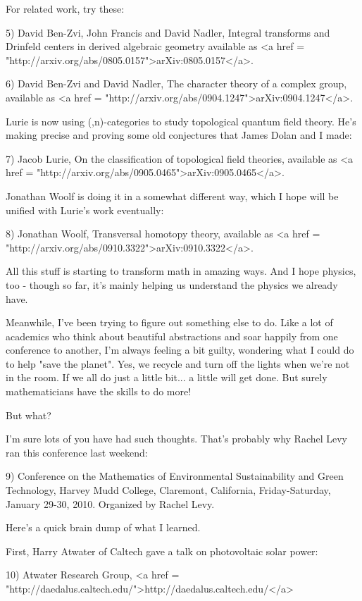 For related work, try these:

5) David Ben-Zvi, John Francis and David Nadler, Integral transforms
and Drinfeld centers in derived algebraic geometry available as
<a href = "http://arxiv.org/abs/0805.0157">arXiv:0805.0157</a>.

6) David Ben-Zvi and David Nadler, The character theory of a complex
group, available as 
<a href = "http://arxiv.org/abs/0904.1247">arXiv:0904.1247</a>.

Lurie is now using (\infty ,n)-categories to study topological
quantum field theory.  He's making precise and proving some old
conjectures that James Dolan and I made:

7) Jacob Lurie, On the classification of topological field theories,
available as 
<a href = "http://arxiv.org/abs/0905.0465">arXiv:0905.0465</a>.

Jonathan Woolf is doing it in a somewhat different way, which I hope
will be unified with Lurie's work eventually:

8) Jonathan Woolf, Transversal homotopy theory, available as
<a href = "http://arxiv.org/abs/0910.3322">arXiv:0910.3322</a>.

All this stuff is starting to transform math in amazing ways.  And I
hope physics, too - though so far, it's mainly helping us understand
the physics we already have.

Meanwhile, I've been trying to figure out something else to do.  Like
a lot of academics who think about beautiful abstractions and soar
happily from one conference to another, I'm always feeling a bit
guilty, wondering what I could do to help "save the planet".
Yes, we recycle and turn off the lights when we're not in the room.
If we all do just a little bit... a little will get done.  But surely
mathematicians have the skills to do more!

But what?

I'm sure lots of you have had such thoughts.  That's probably why Rachel
Levy ran this conference last weekend:

9) Conference on the Mathematics of Environmental Sustainability and
Green Technology, Harvey Mudd College, Claremont, California,
Friday-Saturday, January 29-30, 2010.  Organized by Rachel Levy.

Here's a quick brain dump of what I learned.  

First, Harry Atwater of Caltech gave a talk on photovoltaic solar
power:

10) Atwater Research Group, <a href =
"http://daedalus.caltech.edu/">http://daedalus.caltech.edu/</a>

